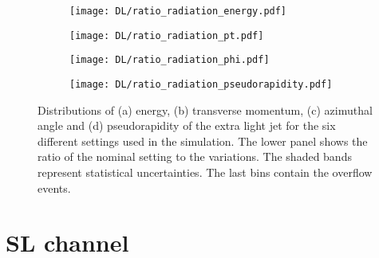 \begin{figure}[H]
    \centering
    \begin{subfigure}{0.49\textwidth}
        \centering
        \texttt{[image: DL/ratio\_radiation\_energy.pdf]}
        \caption{}
        \label{app:subfig:E(radiation)_DL}
    \end{subfigure}
    \begin{subfigure}{0.49\textwidth}
        \centering
        \texttt{[image: DL/ratio\_radiation\_pt.pdf]}
        \caption{}
        \label{app:subfig:pt(radiation)_DL}
    \end{subfigure}

    \vspace{0.2cm}
    
    \begin{subfigure}{0.49\textwidth}
        \centering
        \texttt{[image: DL/ratio\_radiation\_phi.pdf]}
        \caption{}
        \label{app:subfig:phi(radiation)_DL}
    \end{subfigure}
    \begin{subfigure}{0.49\textwidth}
        \centering
        \texttt{[image: DL/ratio\_radiation\_pseudorapidity.pdf]}
        \caption{}
        \label{app:subfig:eta(radiation)_DL}
    \end{subfigure}
    \caption{Distributions of (a) energy, (b) transverse momentum,  (c) azimuthal angle and (d) pseudorapidity of the extra light jet for the six different settings used in the simulation. The lower panel shows the ratio of the nominal setting to the variations. The shaded bands represent statistical uncertainties. The last bins contain the overflow events.}
    \label{app:fig:radiation_DL}
\end{figure}


\section{\label{app:SL}SL channel}


